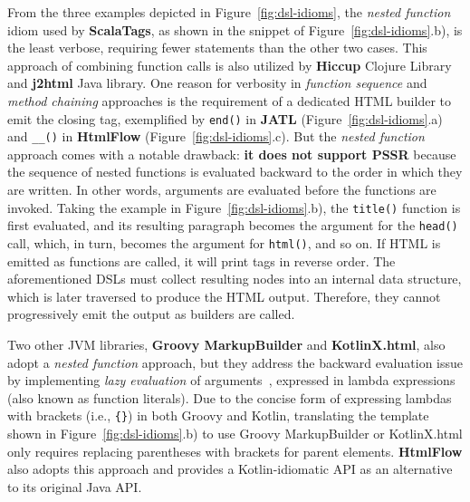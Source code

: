 From the three examples depicted in Figure~\ref{fig:dsl-idioms}, the
\textit{nested function} idiom used by \textbf{ScalaTags}, as shown in the
snippet of Figure~\ref{fig:dsl-idioms}.b), is the least verbose, requiring
fewer statements than the other two cases. This approach of combining function
calls is also utilized by \textbf{Hiccup} Clojure Library and \textbf{j2html}
Java library. One reason for verbosity in \textit{function sequence} and
\textit{method chaining} approaches is the requirement of a dedicated HTML
builder to emit the closing tag, exemplified by \texttt{end()} in \textbf{JATL}
(Figure~\ref{fig:dsl-idioms}.a) and \texttt{\_\_()} in \textbf{HtmlFlow}
(Figure~\ref{fig:dsl-idioms}.c). But the \textit{nested function} approach
comes with a notable drawback: \textbf{it does not support PSSR} because the
sequence of nested functions is evaluated backward to the order in which they
are written. In other words, arguments are evaluated before the functions are
invoked. Taking the example in Figure~\ref{fig:dsl-idioms}.b), the
\texttt{title()} function is first evaluated, and its resulting paragraph
becomes the argument for the \texttt{head()} call, which, in turn, becomes the
argument for \texttt{html()}, and so on. If HTML is emitted as functions are
called, it will print tags in reverse order. The aforementioned DSLs must
collect resulting nodes into an internal data structure, which is later
traversed to produce the HTML output. Therefore, they cannot progressively emit
the output as builders are called.

Two other JVM libraries, \textbf{Groovy MarkupBuilder} and
\textbf{KotlinX.html}, also adopt a \textit{nested function} approach, but they
address the backward evaluation issue by implementing \textit{lazy evaluation}
of arguments~\cite{Landin65}, expressed in lambda expressions (also known as
function literals). Due to the concise form of expressing lambdas with brackets
(i.e., \texttt{\{\}}) in both Groovy and Kotlin, translating the template shown
in Figure~\ref{fig:dsl-idioms}.b) to use Groovy MarkupBuilder or KotlinX.html
only requires replacing parentheses with brackets for parent elements.
\textbf{HtmlFlow} also adopts this approach and provides a Kotlin-idiomatic API
as an alternative to its original Java API.


